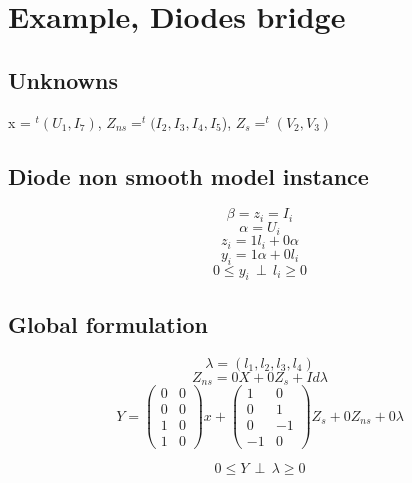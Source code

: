 \section{Example, Diodes bridge}

\begin{figure}[h]
\centerline{
 \scalebox{0.7}{
    
 }
}\end{figure}




\subsection{Unknowns}

x = $^{t}(U_{1},I_{7})$,
$Z_{ns}=^{t}(I_{2},I_{3},I_{4},I_{5}$),
$Z_{s} = ^{t}(V_{2},V_{3})$
\subsection{Diode non smooth model instance}

\[ \beta = z_{i} = I_{i}\]
\[ \alpha =U_{i}\]
\[z_{i}=1l_{i}+0\alpha\]
\[y_{i}=1\alpha+0l_{i}\]
\[0 \leq y_{i} \, \perp \, l_{i} \geq 0\]


\subsection{Global formulation}

\[ \lambda =(l_{1},l_{2},l_{3},l_{4})\]
\[Z_{ns}=0X+0Z_{s}+Id\lambda\]
\[Y=\left(\begin{array}{cc}
0&0\\
0&0\\
1&0\\
1&0\end{array}\right) x+
\left(\begin{array}{cc}
1&0\\
0&1\\
0&-1\\
-1&0\end{array}
\right) Z_{s} + 0Z_{ns} +0\lambda\]

\[0 \leq Y \, \perp \, \lambda \geq 0\]



